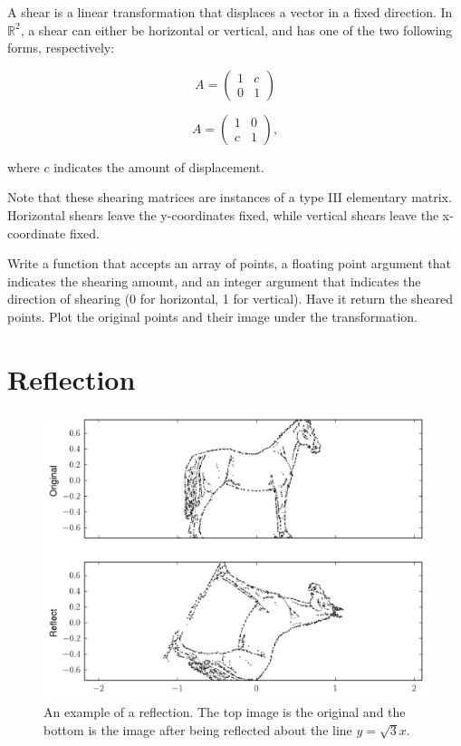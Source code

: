 A shear is a linear transformation that displaces a vector in a fixed direction. In $\mathbb{R}^2$, a shear can either be horizontal or vertical, and has one of the two following forms, respectively:

\[
A = \begin{pmatrix}
1 & c \\
0 & 1
\end{pmatrix}
\]

\[
A = \begin{pmatrix}
1 & 0 \\
c & 1
\end{pmatrix},
\]

where $c$ indicates the amount of displacement.  

Note that these shearing matrices are instances of a type III elementary matrix. Horizontal shears leave the y-coordinates fixed, while vertical shears leave the x-coordinate fixed. 

\begin{problem}
Write a function that accepts an array of points, a floating point argument that indicates the shearing amount, and an integer argument
that indicates the direction of shearing (0 for horizontal, 1 for vertical). Have it return the sheared points.
Plot the original points and their image under the transformation.
\end{problem}

\section*{Reflection}

\begin{figure}
\includegraphics[width=\textwidth]{reflect.pdf}
\caption{An example of a reflection. The top image is the original and the bottom is the image after being reflected about the line $y = \sqrt{3}x$.}
\label{basis:reflect}
\end{figure}

